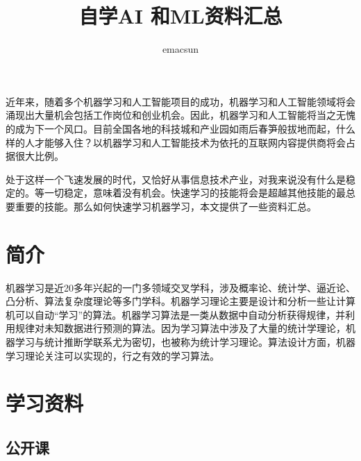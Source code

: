 \documentclass[10pt,a4paper,UTF8]{article}
\author{emacsun}
\date{}
\title{自学AI 和ML资料汇总}
\begin{document}
\maketitle
\tableofcontents
{}
\newpage

近年来，随着多个机器学习和人工智能项目的成功，机器学习和人工智能领域将会涌现出大量机会包括工作岗位和创业机会。因此，机器学习和人工智能将当之无愧的成为下一个风口。目前全国各地的科技城和产业园如雨后春笋般拔地而起，什么样的人才能够入住？以机器学习和人工智能技术为依托的互联网内容提供商将会占据很大比例。

处于这样一个飞速发展的时代，又恰好从事信息技术产业，对我来说没有什么是稳定的。等一切稳定，意味着没有机会。快速学习的技能将会是超越其他技能的最总要重要的技能。那么如何快速学习机器学习，本文提供了一些资料汇总。

\section{简介}
\label{sec:orgbcf2827}


机器学习是近20多年兴起的一门多领域交叉学科，涉及概率论、统计学、逼近论、凸分析、算法复杂度理论等多门学科。机器学习理论主要是设计和分析一些让计算机可以自动“学习”的算法。机器学习算法是一类从数据中自动分析获得规律，并利用规律对未知数据进行预测的算法。因为学习算法中涉及了大量的统计学理论，机器学习与统计推断学联系尤为密切，也被称为统计学习理论。算法设计方面，机器学习理论关注可以实现的，行之有效的学习算法。

\section{学习资料}
\label{sec:orgbf8c163}

\subsection{公开课}
\label{sec:org9dad3bd}
\end{document}
